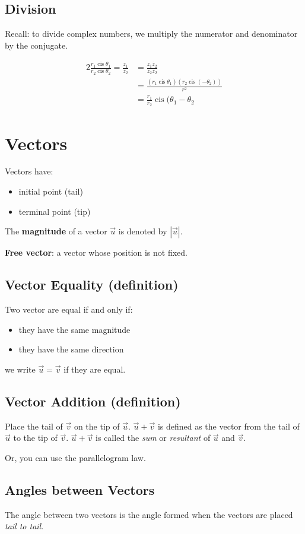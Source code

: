 \documentclass{article}
\DeclareMathOperator\cis{cis}
\numberwithin{equation}{section}
\begin{document}
\subsection{Division}
Recall: to divide complex numbers, we multiply the numerator and denominator by the conjugate.

\begin{alignat*}{2}{}
	\frac{r_1 \cis \theta_1}{r_2 \cis \theta_2} = \frac{z_1}{z_2} &= \frac{z_1 \overline{z}_2}{z_2\overline{z}_2} \\
	&= \frac{(r_1\cis\theta_1)(r_2\cis(-\theta_2))}{r^2} \\
	&= \frac{r_1}{r_2}\cis(\theta_1-\theta_2
\end{alignat*}
\section{Vectors}
Vectors have:
\begin{itemize}
	\item initial point (tail)
	\item terminal point (tip)
\end{itemize}
The \textbf{magnitude} of a vector $\vec u$ is denoted by $| \vec u |$.

\bigskip \noindent
\textbf{Free vector}: a vector whose position is not fixed.

\subsection{Vector Equality (definition)}
Two vector are equal if and only if:
\begin{itemize}
	\item they have the same magnitude
	\item they have the same direction	
\end{itemize}
we write $\vec u = \vec v$ if they are equal.

\subsection{Vector Addition (definition)}
Place the tail of $\vec v$ on the tip of $\vec u$. $\vec u + \vec v$ is defined as the vector from the tail of $\vec u$ to the tip of $\vec v$. $\vec u + \vec v$ is called the \emph{sum} or \emph{resultant} of $\vec u$ and $\vec v$.

Or, you can use the parallelogram law.

\subsection{Angles between Vectors}
The angle between two vectors is the angle formed when the vectors are placed \emph{tail to tail}.
\end{document}

